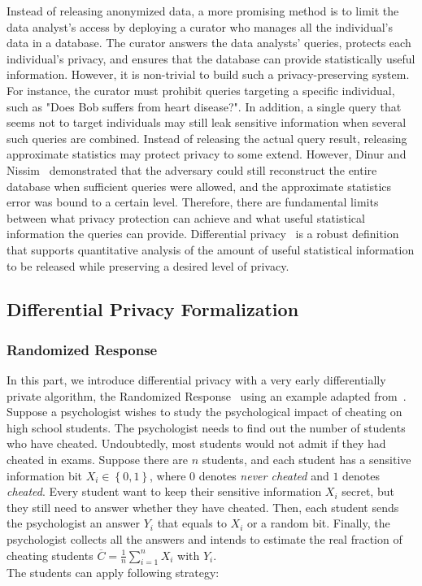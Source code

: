 Instead of releasing anonymized data, a more promising method is to limit the data analyst's access by deploying a curator who manages all the individual's data in a database. The curator answers the data analysts' queries, protects each individual's privacy, and ensures that the database can provide statistically useful information. However, it is non-trivial to build such a privacy-preserving system. For instance, the curator must prohibit queries targeting a specific individual, such as "Does Bob suffers from heart disease?". In addition, a single query that seems not to target individuals may still leak sensitive information when several such queries are combined. Instead of releasing the actual query result, releasing approximate statistics may protect privacy to some extend. However, Dinur and Nissim~\cite{dinur2003revealing} demonstrated that the adversary could still reconstruct the entire database when sufficient queries were allowed, and the approximate statistics error was bound to a certain level. Therefore, there are fundamental limits between what privacy protection can achieve and what useful statistical information the queries can provide.
Differential privacy~\cite{dwork2006differential, dwork2006calibrating} is a robust definition that supports quantitative analysis of the amount of useful statistical information to be released while preserving a desired level of privacy.


\subsection{Differential Privacy Formalization}

\subsubsection{Randomized Response}
\label{subsubsection:randomizedresponse}
In this part, we introduce differential privacy with a very early differentially private algorithm, the Randomized Response~\cite{warner1965randomized} using an example adapted from~\cite{KamathLec3AlgorithmsrivateDataAnalysis}.
Suppose a psychologist wishes to study the psychological impact of cheating on high school students. The psychologist needs to find out the number of students who have cheated. Undoubtedly, most students would not admit if they had cheated in exams. Suppose there are $n$ students, and each student has a sensitive information bit $X_{i}\in \left\{ 0,1\right\} $, where $0$ denotes \textit{never cheated} and $1$ denotes \textit{cheated}. Every student want to keep their sensitive information $X_{i}$ secret, but they still need to answer whether they have cheated. Then, each student sends the psychologist an answer $Y_{i}$ that equals to $X_{i}$ or a random bit. Finally, the psychologist collects all the answers and intends to estimate the real fraction of cheating students $\overline{C}=\frac{1}{n}\sum ^{n}_{i=1}X_{i}$ with $Y_i$. \\
The students can apply following strategy:

